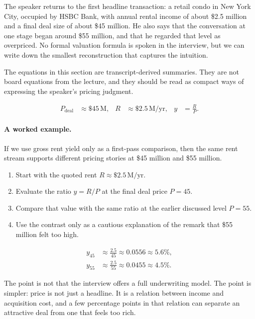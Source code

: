 The speaker returns to the first headline transaction: a retail condo in New York City, occupied by HSBC Bank, with annual rental income of about \$2.5 million and a final deal size of about \$45 million. He also says that the conversation at one stage began around \$55 million, and that he regarded that level as overpriced. No formal valuation formula is spoken in the interview, but we can write down the smallest reconstruction that captures the intuition.

\begin{remark}
The equations in this section are transcript-derived summaries. They are not board equations from the lecture, and they should be read as compact ways of expressing the speaker's pricing judgment.
\end{remark}

\begin{align}
P_{\text{deal}} &\approx \$45\,\text{M}, &
R &\approx \$2.5\,\text{M/yr}, &
y &= \frac{R}{P}.
\end{align}

\paragraph{A worked example.}
If we use gross rent yield only as a first-pass comparison, then the same rent stream supports different pricing stories at \$45 million and \$55 million.

\begin{enumerate}
\item Start with the quoted rent \(R \approx \$2.5\,\text{M/yr}\).
\item Evaluate the ratio \(y = R/P\) at the final deal price \(P=45\).
\item Compare that value with the same ratio at the earlier discussed level \(P=55\).
\item Use the contrast only as a cautious explanation of the remark that \$55 million felt too high.
\end{enumerate}

\begin{align}
y_{45} &\approx \frac{2.5}{45} \approx 0.0556 \approx 5.6\%, \\
y_{55} &\approx \frac{2.5}{55} \approx 0.0455 \approx 4.5\%.
\end{align}

The point is not that the interview offers a full underwriting model. The point is simpler: price is not just a headline. It is a relation between income and acquisition cost, and a few percentage points in that relation can separate an attractive deal from one that feels too rich.

